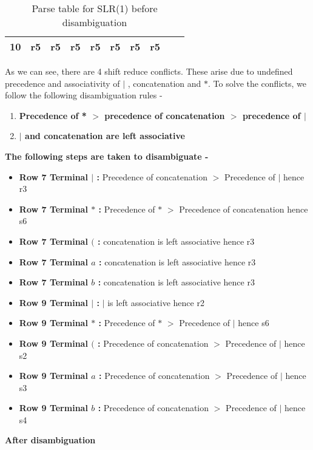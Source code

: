 \documentclass[12pt,fullpage]{exam}
\begin{document}
\begin{questions}
\begin{table}[H]
\begin{tabular}{|l|l|l|l|l|l|l|l|l|l|}
\textbf{10}                     & r5                                              & r5                                              & r5                                              & r5  & r5                                              & r5                                              & r5     &                  &                 \\ \hline
\end{tabular}
\caption{Parse table for SLR(1) before disambiguation}
\end{table}
As we can see, there are 4 shift reduce conflicts. These arise due to undefined precedence and associativity of $|$ , concatenation and $*$. To solve the conflicts, we follow the following disambiguation rules - 
\begin{enumerate}
    \item \textbf{Precedence of * $>$ precedence of concatenation $>$ precedence of $|$}
    \item \textbf{$|$ and concatenation are left associative}
\end{enumerate}
\textbf{The following steps are taken to disambiguate - }
\begin{itemize}
    \item \textbf{Row 7 Terminal $|$ :} Precedence of concatenation  $>$ Precedence of $|$ hence r3
    \item \textbf{Row 7 Terminal $*$ :} Precedence of $*$  $>$ Precedence of concatenation hence s6
    \item \textbf{Row 7 Terminal $($ :} concatenation is left associative hence r3
    \item \textbf{Row 7 Terminal $a$ :} concatenation is left associative hence r3
    \item \textbf{Row 7 Terminal $b$ :} concatenation is left associative hence r3
    \item \textbf{Row 9 Terminal $|$ :} $|$ is left associative hence r2
    \item \textbf{Row 9 Terminal $*$ :} Precedence of $*$  $>$ Precedence of $|$ hence s6
    \item \textbf{Row 9 Terminal $($ :} Precedence of concatenation  $>$ Precedence of $|$ hence s2
    \item \textbf{Row 9 Terminal $a$ :} Precedence of concatenation  $>$ Precedence of $|$ hence s3
    \item \textbf{Row 9 Terminal $b$ :} Precedence of concatenation  $>$ Precedence of $|$ hence s4
\end{itemize}
\textbf{After disambiguation}


\end{questions}
\end{document}
